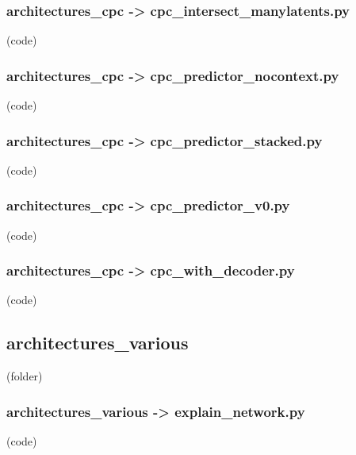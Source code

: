 \begin{myparindent}{0pt}

\noindent\subsubsection[cpc\_intersect\_manylatents.py]{architectures\_cpc -> cpc\_intersect\_manylatents.py} (code)

\noindent\subsubsection[cpc\_predictor\_nocontext.py]{architectures\_cpc -> cpc\_predictor\_nocontext.py} (code)

\noindent\subsubsection[cpc\_predictor\_stacked.py]{architectures\_cpc -> cpc\_predictor\_stacked.py} (code)

\noindent\subsubsection[cpc\_predictor\_v0.py]{architectures\_cpc -> cpc\_predictor\_v0.py} (code)

\noindent\subsubsection[cpc\_with\_decoder.py]{architectures\_cpc -> cpc\_with\_decoder.py} (code)

\noindent\subsection[architectures\_various]{architectures\_various} (folder)
\noindent\subsubsection[explain\_network.py]{architectures\_various -> explain\_network.py} (code)

\end{myparindent}
